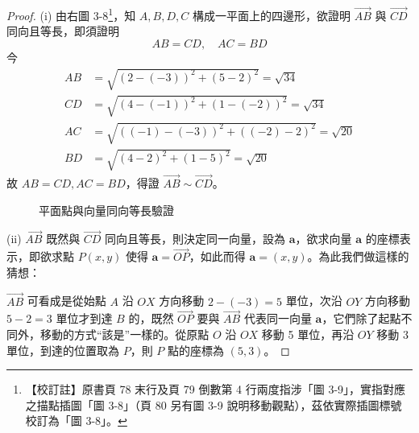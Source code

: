\begin{proof}
(i) \label{note:b3s-ch3-p78-fig3-9}%
由右圖 3-8\footnote{【校訂註】原書頁 78 末行及頁 79 倒數第 4 行兩度指涉「圖 3-9」，實指對應之描點插圖「圖 3-8」（頁 80 另有圖 3-9 說明移動觀點），茲依實際插圖標號校訂為「圖 3-8」。}，知 $A, B, D, C$ 構成一平面上的四邊形，欲證明 $\vec{AB}$ 與 $\vec{CD}$ 同向且等長，即須證明
\[ AB = CD, \quad AC = BD \]
今
\begin{align*}
AB &= \sqrt{(2 - (-3))^2 + (5 - 2)^2} = \sqrt{34} \\
CD &= \sqrt{(4 - (-1))^2 + (1 - (-2))^2} = \sqrt{34} \\
AC &= \sqrt{((-1) - (-3))^2 + ((-2) - 2)^2} = \sqrt{20} \\
BD &= \sqrt{(4 - 2)^2 + (1 - 5)^2} = \sqrt{20}
\end{align*}
故 $AB = CD, AC = BD$，得證 $\vec{AB} \sim \vec{CD}$。

\begin{figure}[H]
\centering
{}
\caption{平面點與向量同向等長驗證}
\label{fig:b3s-fig3-8}
\end{figure}

(ii) $\vec{AB}$ 既然與 $\vec{CD}$ 同向且等長，則決定同一向量，設為 $\mathbf{a}$，欲求向量 $\mathbf{a}$ 的座標表示，即欲求點 $P(x, y)$ 使得 $\mathbf{a} = \vec{OP}$，如此而得 $\mathbf{a} = (x, y)$。為此我們做這樣的猜想：

$\vec{AB}$ 可看成是從始點 $A$ 沿 $OX$ 方向移動 $2 - (-3) = 5$ 單位，次沿 $OY$ 方向移動 $5 - 2 = 3$ 單位才到達 $B$ 的，既然 $\vec{OP}$ 要與 $\vec{AB}$ 代表同一向量 $\mathbf{a}$，它們除了起點不同外，移動的方式``該是''一樣的。從原點 $O$ 沿 $OX$ 移動 5 單位，再沿 $OY$ 移動 3 單位，到達的位置取為 $P$，則 $P$ 點的座標為 $(5, 3)$。


\end{proof}
